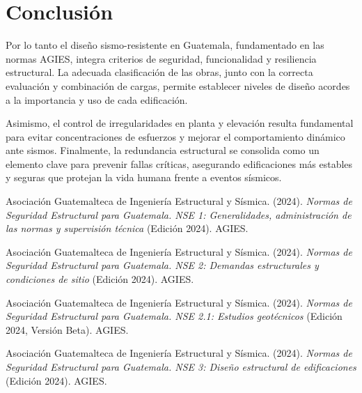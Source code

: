 \documentclass[14pt,letterpaper]{extarticle}
\begin{document}
	
	
	
	
		\newpage
	

	\section{Conclusión}
	
	Por lo tanto el diseño sismo-resistente en Guatemala, fundamentado en las normas AGIES, integra criterios de seguridad, funcionalidad y resiliencia estructural. La adecuada clasificación de las obras, junto con la correcta evaluación y combinación de cargas, permite establecer niveles de diseño acordes a la importancia y uso de cada edificación. 
	
	Asimismo, el control de irregularidades en planta y elevación resulta fundamental para evitar concentraciones de esfuerzos y mejorar el comportamiento dinámico ante sismos. Finalmente, la redundancia estructural se consolida como un elemento clave para prevenir fallas críticas, asegurando edificaciones más estables y seguras que protejan la vida humana frente a eventos sísmicos.
	




	
	\newpage

	
	
\renewcommand{\refname}{Referencias}




\renewcommand{\refname}{Referencias}




	Asociación Guatemalteca de Ingeniería Estructural y Sísmica. (2024). \textit{Normas de Seguridad Estructural para Guatemala. NSE 1: Generalidades, administración de las normas y supervisión técnica} (Edición 2024). AGIES.
	
	Asociación Guatemalteca de Ingeniería Estructural y Sísmica. (2024). \textit{Normas de Seguridad Estructural para Guatemala. NSE 2: Demandas estructurales y condiciones de sitio} (Edición 2024). AGIES.
	
	Asociación Guatemalteca de Ingeniería Estructural y Sísmica. (2024). \textit{Normas de Seguridad Estructural para Guatemala. NSE 2.1: Estudios geotécnicos} (Edición 2024, Versión Beta). AGIES.
	
	Asociación Guatemalteca de Ingeniería Estructural y Sísmica. (2024). \textit{Normas de Seguridad Estructural para Guatemala. NSE 3: Diseño estructural de edificaciones} (Edición 2024). AGIES.
	


		
	
	
	
\end{document}

